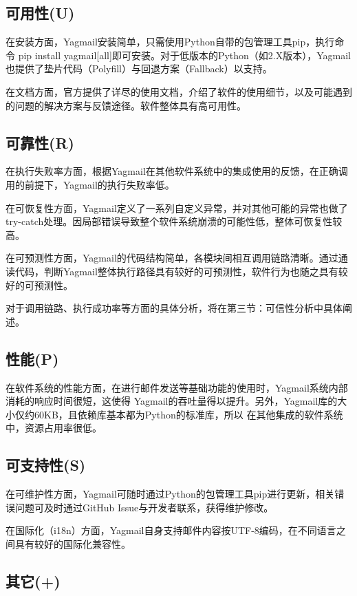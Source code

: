 \documentclass[UTF8,12pt,a4paper]{ctexart}
\begin{document}
\subsection{可用性(U)}

在安装方面，Yagmail安装简单，只需使用Python自带的包管理工具pip，执行命令
pip install yagmail[all]即可安装。对于低版本的Python（如2.X版本），Yagmail
也提供了垫片代码（Polyfill）与回退方案（Fallback）以支持。

在文档方面，官方提供了详尽的使用文档，介绍了软件的使用细节，以及可能遇到的问题的解决方案与反馈途径。软件整体具有高可用性。

\subsection{可靠性(R)}

在执行失败率方面，根据Yagmail在其他软件系统中的集成使用的反馈，在正确调用的前提下，Yagmail的执行失败率低。

在可恢复性方面，Yagmail定义了一系列自定义异常，并对其他可能的异常也做了try-catch处理。因局部错误导致整个软件系统崩溃的可能性低，整体可恢复性较高。

在可预测性方面，Yagmail的代码结构简单，各模块间相互调用链路清晰。通过通读代码，判断Yagmail整体执行路径具有较好的可预测性，软件行为也随之具有较好的可预测性。

对于调用链路、执行成功率等方面的具体分析，将在第三节：可信性分析中具体阐述。

\subsection{性能(P)}

在软件系统的性能方面，在进行邮件发送等基础功能的使用时，Yagmail系统内部消耗的响应时间很短，这使得
Yagmail的吞吐量得以提升。另外，Yagmail库的大小仅约60KB，且依赖库基本都为Python的标准库，所以
在其他集成的软件系统中，资源占用率很低。

\subsection{可支持性(S)}

在可维护性方面，Yagmail可随时通过Python的包管理工具pip进行更新，相关错误问题可及时通过GitHub Issue与开发者联系，获得维护修改。

在国际化（i18n）方面，Yagmail自身支持邮件内容按UTF-8编码，在不同语言之间具有较好的国际化兼容性。

\subsection{其它(+)}
\end{document}
